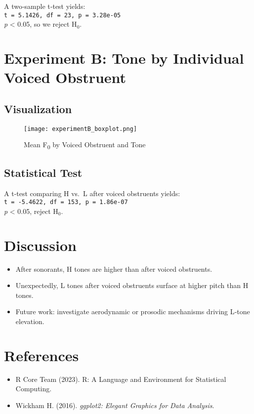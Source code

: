 \documentclass[11pt]{article}
\begin{document}
\noindent
A two‐sample t‐test yields:\\
\texttt{t = 5.1426, df = 23, p = 3.28e-05}\\
\emph{p} < 0.05, so we reject H$_0$.

\section{Experiment B: Tone by Individual Voiced Obstruent}

\subsection{Visualization}

\begin{figure}[h!]
  \centering
  \texttt{[image: experimentB\_boxplot.png]}
  \caption{Mean F\textsubscript{0} by Voiced Obstruent and Tone}
\end{figure}

\subsection{Statistical Test}

A t‐test comparing H vs.\ L after voiced obstruents yields:\\
\texttt{t = -5.4622, df = 153, p = 1.86e-07}\\
\emph{p} < 0.05, reject H$_0$.

\section{Discussion}
\begin{itemize}
  \item After sonorants, H tones are higher than after voiced obstruents.
  \item Unexpectedly, L tones after voiced obstruents surface at higher pitch than H tones.
  \item Future work: investigate aerodynamic or prosodic mechanisms driving L‐tone elevation.
\end{itemize}

\section*{References}
\begin{itemize}
  \item R Core Team (2023). R: A Language and Environment for Statistical Computing.
  \item Wickham H. (2016). \emph{ggplot2: Elegant Graphics for Data Analysis}.
\end{itemize}
\end{document}
